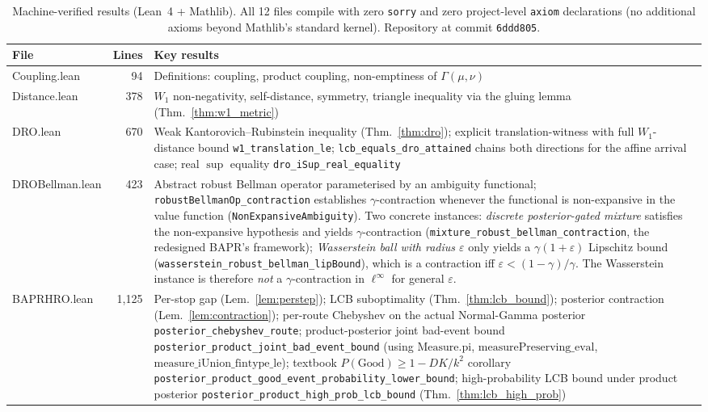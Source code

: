 \documentclass[11pt]{article}
\theoremstyle{definition}
\theoremstyle{remark}
\begin{document}
\begin{table}[!htbp]
\centering
\caption{Machine-verified results (Lean~4 + Mathlib). All 12 files compile with zero \texttt{sorry} and zero project-level \texttt{axiom} declarations (no additional axioms beyond Mathlib's standard kernel). Repository at commit \texttt{6ddd805}.}
\label{tab:lean}
\scriptsize
\begin{tabular}{lrp{8.4cm}}
\toprule
File & Lines & Key results \\
\midrule
Coupling.lean & 94 & Definitions: coupling, product coupling, non-emptiness of $\Gamma(\mu,\nu)$ \\
Distance.lean & 378 & $W_1$ non-negativity, self-distance, symmetry, triangle inequality via the gluing lemma (Thm.~\ref{thm:w1_metric}) \\
DRO.lean & 670 & Weak Kantorovich--Rubinstein inequality (Thm.~\ref{thm:dro}); explicit translation-witness with full $W_1$-distance bound \texttt{w1\_translation\_le}; \texttt{lcb\_equals\_dro\_attained} chains both directions for the affine arrival case; real $\sup$ equality \texttt{dro\_iSup\_real\_equality} \\
DROBellman.lean & 423 & Abstract robust Bellman operator parameterised by an ambiguity functional; \texttt{robustBellmanOp\_contraction} establishes $\gamma$-contraction whenever the functional is non-expansive in the value function (\texttt{NonExpansiveAmbiguity}). Two concrete instances: \emph{discrete posterior-gated mixture} satisfies the non-expansive hypothesis and yields $\gamma$-contraction (\texttt{mixture\_robust\_bellman\_contraction}, the redesigned BAPR's framework); \emph{Wasserstein ball with radius $\varepsilon$} only yields a $\gamma(1+\varepsilon)$ Lipschitz bound (\texttt{wasserstein\_robust\_bellman\_lipBound}), which is a contraction iff $\varepsilon\!<\!(1-\gamma)/\gamma$. The Wasserstein instance is therefore \emph{not} a $\gamma$-contraction in $\ell^\infty$ for general $\varepsilon$. \\
BAPRHRO.lean & 1{,}125 & Per-stop gap (Lem.~\ref{lem:perstep}); LCB suboptimality (Thm.~\ref{thm:lcb_bound}); posterior contraction (Lem.~\ref{lem:contraction}); per-route Chebyshev on the actual Normal-Gamma posterior \texttt{posterior\_chebyshev\_route}; product-posterior joint bad-event bound \texttt{posterior\_product\_joint\_bad\_event\_bound} (using $\mathrm{Measure.pi}$, $\mathrm{measurePreserving\_eval}$, $\mathrm{measure\_iUnion\_fintype\_le}$); textbook $P(\mathrm{Good}) \geq 1 - DK/k^2$ corollary \texttt{posterior\_product\_good\_event\_probability\_lower\_bound}; high-probability LCB bound under product posterior \texttt{posterior\_product\_high\_prob\_lcb\_bound} (Thm.~\ref{thm:lcb_high_prob}) \\

\end{tabular}
\end{table}
\end{document}

